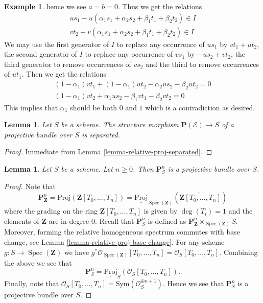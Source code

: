 \documentclass{stacks-project}
\theoremstyle{plain}
\newtheorem{lemma}[subsection]{Lemma}
\theoremstyle{definition}
\newtheorem{example}[subsection]{Example}
\theoremstyle{remark}
\numberwithin{equation}{subsection}
\def\Spec{\mathop{\mathrm{Spec}}}
\begin{document}
\begin{example}
hence we see $a = b = 0$. Thus we get the relations
$$
\begin{matrix}
us_1 - u(\alpha_1s_1 + \alpha_2s_2 + \beta_1t_1 + \beta_2t_2)
\in I \\
vt_2 - v(\alpha_1s_1 + \alpha_2s_2 + \beta_1t_1 + \beta_2t_2)
\in I
\end{matrix}
$$
We may use the first generator of $I$ to replace any occurrence of
$us_1$ by $vt_1 + ut_2$, the second generator of $I$ to replace any
occurrence of $vs_1$ by $-us_2 + vt_2$, the third generator
to remove occurrences of $vs_2$ and the third to remove occurrences
of $ut_1$. Then we get the relations
$$
\begin{matrix}
(1 - \alpha_1)vt_1 + (1 - \alpha_1)ut_2 - \alpha_2us_2 - \beta_2ut_2 = 0 \\
(1 - \alpha_1)vt_2 + \alpha_1us_2 - \beta_1vt_1 - \beta_2vt_2 = 0
\end{matrix}
$$
This implies that $\alpha_1$ should be both $0$ and $1$ which is
a contradiction as desired.
\end{example}


\begin{lemma}
\label{lemma-projective-bundle-separated}
Let $S$ be a scheme.
The structure morphism $\mathbf{P}(\mathcal{E}) \to S$ of a
projective bundle over $S$ is separated.
\end{lemma}

\begin{proof}
Immediate from Lemma \ref{lemma-relative-proj-separated}.
\end{proof}

\begin{lemma}
\label{lemma-projective-space-bundle}
Let $S$ be a scheme. Let $n \geq 0$. Then
$\mathbf{P}^n_S$ is a projective bundle over $S$.
\end{lemma}

\begin{proof}
Note that
$$
\mathbf{P}^n_{\mathbf{Z}} =
\text{Proj}(\mathbf{Z}[T_0, \ldots, T_n]) =
\underline{\text{Proj}}_{\Spec(\mathbf{Z})}
\left(\widetilde{\mathbf{Z}[T_0, \ldots, T_n]}\right)
$$
where the grading on the ring $\mathbf{Z}[T_0, \ldots, T_n]$ is given by
$\deg(T_i) = 1$ and the elements of $\mathbf{Z}$ are in degree $0$.
Recall that $\mathbf{P}^n_S$ is defined as
$\mathbf{P}^n_{\mathbf{Z}} \times_{\Spec(\mathbf{Z})} S$.
Moreover, forming the relative homogeneous spectrum commutes with base change,
see Lemma \ref{lemma-relative-proj-base-change}.
For any scheme $g : S \to \Spec(\mathbf{Z})$ we have
$g^*\mathcal{O}_{\Spec(\mathbf{Z})}[T_0, \ldots, T_n]
= \mathcal{O}_S[T_0, \ldots, T_n]$.
Combining the above we see that
$$
\mathbf{P}^n_S = \underline{\text{Proj}}_S(\mathcal{O}_S[T_0, \ldots, T_n]).
$$
Finally, note that
$\mathcal{O}_S[T_0, \ldots, T_n] = \text{Sym}(\mathcal{O}_S^{\oplus n + 1})$.
Hence we see that $\mathbf{P}^n_S$ is a projective bundle over $S$.
\end{proof}
\end{document}
